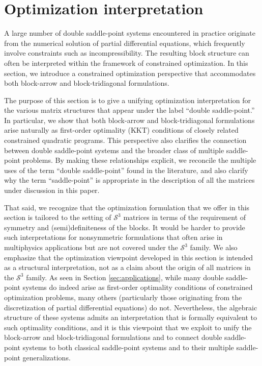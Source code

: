 \documentclass{article}
\newcommand{\st}{\mathcal{S}^3}
\begin{document}
\section{Optimization interpretation}
\label{sec:class}

A large number of double saddle-point systems encountered in practice originate from the numerical solution of partial differential equations, which frequently involve constraints such as incompressibility. The resulting block structure can often be interpreted within the framework of constrained optimization. In this section, we introduce a constrained optimization perspective that accommodates both block-arrow and block-tridiagonal formulations.

The purpose of this section is to give a
unifying optimization interpretation for the various matrix structures that
appear under the label ``double saddle-point.'' In particular, we show that both
block-arrow and block-tridiagonal formulations arise naturally as first-order optimality (KKT) conditions of closely related constrained quadratic programs. This perspective also clarifies the connection between double saddle-point systems and the broader class of multiple saddle-point problems. By making these relationships explicit, we reconcile the multiple uses of the term ``double saddle-point'' found in the literature, and also clarify why the term ``saddle-point'' is appropriate in the description of all the matrices under discussion in this paper. 

That said, we recognize that the optimization formulation that we offer in this section is tailored to the setting of $\st$ matrices in terms of the requirement of symmetry and (semi)definiteness of the blocks. It would be harder to provide such interpretations for nonsymmetric formulations that often arise in multiphysics applications but are not covered under the $\st$ family. We also emphasize that the optimization viewpoint developed in this section is intended as a structural interpretation, not as a claim about the origin of all matrices in the $\st$ family. As seen in Section \ref{sec:applications}, while many double saddle-point systems do indeed arise as first-order optimality conditions of constrained optimization problems, many others (particularly those originating from the discretization of partial differential equations) do not. Nevertheless, the algebraic structure of these systems admits an interpretation that is formally equivalent to such optimality conditions, and it is this viewpoint that we exploit to unify the block-arrow and block-tridiagonal formulations and to connect double saddle-point systems to both classical saddle-point systems and to their multiple saddle-point generalizations.
\end{document}
